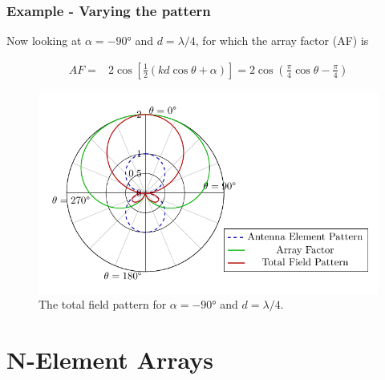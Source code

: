 \documentclass[10pt]{beamer}
\begin{document}
\begin{frame}
    \frametitle{Example - Varying the pattern}

    \begin{outline}
        \1 Now looking at $\alpha = \ang{-90}$ and $d = \lambda/4$, for which the array factor (AF) is
    \end{outline}
    \small
    \begin{align*}
        AF {}=& 2 \cos \left[ \frac{1}{2} \left( k d \cos \theta + \alpha  \right) \right] = 2 \cos \left(\frac{\pi}{4}\cos \theta - \frac{\pi}{4}\right)
    \end{align*}
    \normalsize
\begin{figure}[T!]
    \centering
    \includegraphics[width=.55\textwidth]{total_pattern_d_quarter_alpha_minus90.pdf}
    \caption{The total field pattern for $\alpha = \ang{-90}$ and $d = \lambda/4$.}
    \label{fig:antenna_array_alpha_-90}
\end{figure}  

\end{frame}


\section{N-Element Arrays}
\end{document}

